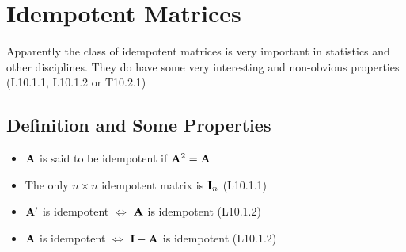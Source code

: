 \documentclass[a4paper, oneside]{book}
\begin{document}
\chapter{Idempotent Matrices}
Apparently the class of idempotent matrices is very important in statistics and other disciplines. They do have some very interesting and non-obvious properties (\eg L10.1.1, L10.1.2 or T10.2.1)

\section*{Definition and Some Properties}
\begin{itemize}
\item $\mathbf A$ is said to be idempotent if $\mathbf A^2 = \mathbf A$
\item The only $n\times n$ idempotent matrix is $\mathbf I_n$ (L10.1.1)
\item $\mathbf A'$ is idempotent $\iff$ $\mathbf A$ is idempotent (L10.1.2)
\item $\mathbf A$ is idempotent $\iff$ $\mathbf{I-A}$ is idempotent (L10.1.2)
\end{itemize}
\end{document}
